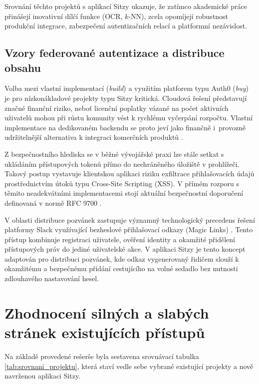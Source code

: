 \documentclass[male,czech,api_bc]{kitheses}
\begin{document}
Srovnání těchto projektů s aplikací Sitzy ukazuje, že zatímco akademické práce 
přinášejí inovativní dílčí funkce (OCR, $k$-NN), zcela opomíjejí robustnost 
produkční integrace, zabezpečení autentizačních relací a platformní nezávislost.

\subsection{Vzory federované autentizace a distribuce obsahu}
\label{subsec:vzory_autentizace}

Volba mezi vlastní implementací (\textit{build}) a využitím platforem typu Auth0 (\textit{buy}) je pro nízkonákladové projekty typu Sitzy kritická. Cloudová řešení představují značné finanční riziko, neboť licenční poplatky vázané na počet aktivních uživatelů mohou při růstu komunity vést k rychlému vyčerpání rozpočtu. Vlastní implementace na dedikovaném backendu se proto jeví jako finančně i~provozně udržitelnější alternativa k integraci komerčních produktů \cite{Auth0Pricing2026,Fatunse2026}.

Z bezpečnostního hlediska se v běžné vývojářské praxi lze stále setkat s ukládáním přístupových tokenů přímo do nechráněného úložiště  v prohlížeči. Takový postup vystavuje klientskou aplikaci riziku exfiltrace přihlašovacích údajů prostřednictvím útoků typu Cross-Site Scripting (XSS). V přímém rozporu s těmito neadekvátními implementacemi stojí aktuální bezpečnostní doporučení definovaná v normě RFC 9700 \cite{Lodderstedt2025}.

V oblasti distribuce pozvánek zastupuje významný technologický precedens řešení platformy Slack využívající bezheslové přihlašovací odkazy (Magic Links) \cite{MagicLinkIF}. Tento přístup kombinuje registraci uživatele, ověření identity a okamžité přidělení přístupových práv do jediné uživatelské akce. V aplikaci Sitzy je tento koncept adaptován pro distribuci pozvánek, kde odkaz vygenerovaný řidičem slouží k okamžitému a bezpečnému přidání cestujícího na volné sedadlo bez nutnosti zdlouhavého nastavování hesel.

\section{Zhodnocení silných a slabých stránek existujících přístupů}
\label{sec:zhodnoceni_pristupu}

Na základě provedené rešerše byla sestavena srovnávací tabulka \vref{tab:srovnani_projektu}, která staví vedle sebe vybrané existující projekty a nově navrženou aplikaci Sitzy.
\end{document}
